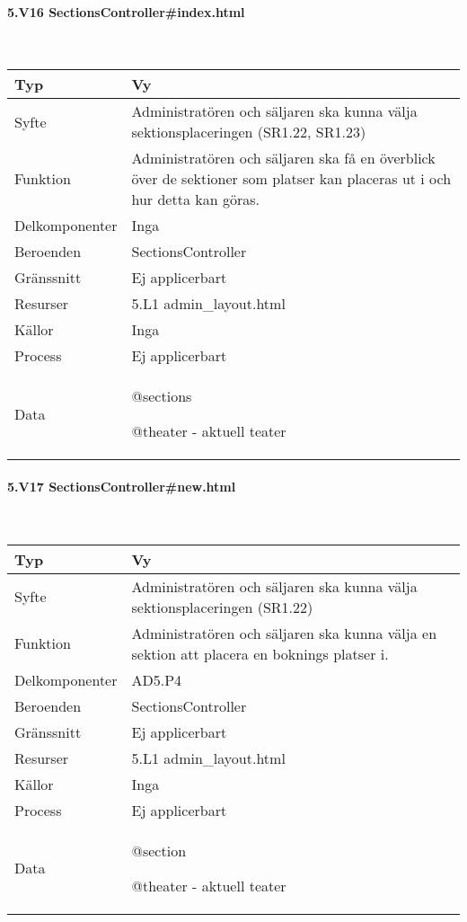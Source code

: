\documentclass[a4paper, twoside, 11pt, titlepage]{article}
\begin{document}
			\paragraph{5.V16 SectionsController\#index.html}\

			\begin {table} [ht] \begin{tabular} {  p{3.5cm} p{9.6cm} }
				\hline
				{Typ} & {Vy} \\
				\hline
				{Syfte} & {Administratören och säljaren ska kunna välja sektionsplaceringen (SR1.22, SR1.23)} \\
				\hline
				{Funktion} & {Administratören och säljaren ska få en överblick över de sektioner som platser kan placeras ut i och hur detta kan göras.} \\
				\hline
				{Delkomponenter} & {Inga} \\
				\hline
				{Beroenden} & {SectionsController} \\
				\hline
				{Gränssnitt} & {Ej applicerbart} \\
				\hline
				{Resurser} & {5.L1 admin\_layout.html} \\
				\hline
				{Källor} & {Inga} \\
				\hline
				{Process} & {Ej applicerbart} \\
				\hline
				{Data} & {@sections

@theater - aktuell teater} \\
				\hline
			\end{tabular} \end{table} \FloatBarrier


			\paragraph{5.V17 SectionsController\#new.html}\

			\begin {table} [ht] \begin{tabular} {  p{3.5cm} p{9.6cm} }
				\hline
				{Typ} & {Vy} \\
				\hline
				{Syfte} & {Administratören och säljaren ska kunna välja sektionsplaceringen (SR1.22)} \\
				\hline
				{Funktion} & {Administratören och säljaren ska kunna välja en sektion att placera en boknings platser i.} \\
				\hline
				{Delkomponenter} & {AD5.P4} \\
				\hline
				{Beroenden} & {SectionsController} \\
				\hline
				{Gränssnitt} & {Ej applicerbart} \\
				\hline
				{Resurser} & {5.L1 admin\_layout.html} \\
				\hline
				{Källor} & {Inga} \\
				\hline
				{Process} & {Ej applicerbart} \\
				\hline
				{Data} & {@section

@theater - aktuell teater} \\
				\hline
			\end{tabular} \end{table} \FloatBarrier
\end{document}
